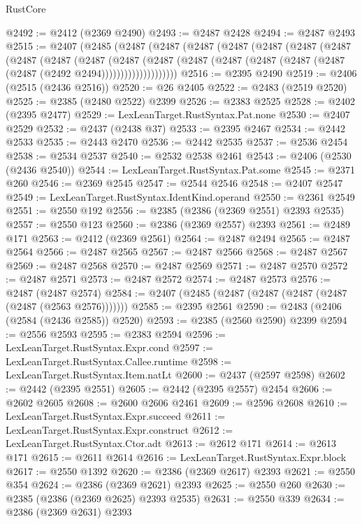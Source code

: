 \begin{lexlean}{RustCore}
\begin{coremodule}
@2492 := @2412 (@2369 @2490)
@2493 := @2487 @2428
@2494 := @2487 @2493
@2515 := @2407
    (@2485
      (@2487
        (@2487
          (@2487
            (@2487
              (@2487
                (@2487
                  (@2487
                    (@2487
                      (@2487
                        (@2487
                          (@2487
                            (@2487
                              (@2487
                                (@2487 (@2487 (@2487 (@2487 (@2487 (@2492 @2494))))))))))))))))))))
@2516 := @2395 @2490
@2519 := @2406 (@2515 (@2436 @2516))
@2520 := @26 @2405
@2522 := @2483 (@2519 @2520)
@2525 := @2385 (@2480 @2522) @2399
@2526 := @2383 @2525
@2528 := @2402 (@2395 @2477)
@2529 := LexLeanTarget.RustSyntax.Pat.none
@2530 := @2407 @2529
@2532 := @2437 (@2438 @37)
@2533 := @2395 @2467
@2534 := @2442 @2533
@2535 := @2443 @2470
@2536 := @2442 @2535
@2537 := @2536 @2454
@2538 := @2534 @2537
@2540 := @2532 @2538 @2461
@2543 := @2406 (@2530 (@2436 @2540))
@2544 := LexLeanTarget.RustSyntax.Pat.some
@2545 := @2371 @260
@2546 := @2369 @2545
@2547 := @2544 @2546
@2548 := @2407 @2547
@2549 := LexLeanTarget.RustSyntax.IdentKind.operand
@2550 := @2361 @2549
@2551 := @2550 @192
@2556 := @2385 (@2386 (@2369 @2551) @2393 @2535)
@2557 := @2550 @123
@2560 := @2386 (@2369 @2557) @2393
@2561 := @2489 @171
@2563 := @2412 (@2369 @2561)
@2564 := @2487 @2494
@2565 := @2487 @2564
@2566 := @2487 @2565
@2567 := @2487 @2566
@2568 := @2487 @2567
@2569 := @2487 @2568
@2570 := @2487 @2569
@2571 := @2487 @2570
@2572 := @2487 @2571
@2573 := @2487 @2572
@2574 := @2487 @2573
@2576 := @2487 (@2487 @2574)
@2584 := @2407 (@2485 (@2487 (@2487 (@2487 (@2487 (@2487 (@2563 @2576)))))))
@2585 := @2395 @2561
@2590 := @2483 (@2406 (@2584 (@2436 @2585)) @2520)
@2593 := @2385 (@2560 @2590) @2399
@2594 := @2556 @2593
@2595 := @2383 @2594
@2596 := LexLeanTarget.RustSyntax.Expr.cond
@2597 := LexLeanTarget.RustSyntax.Callee.runtime
@2598 := LexLeanTarget.RustSyntax.Item.natLt
@2600 := @2437 (@2597 @2598)
@2602 := @2442 (@2395 @2551)
@2605 := @2442 (@2395 @2557) @2454
@2606 := @2602 @2605
@2608 := @2600 @2606 @2461
@2609 := @2596 @2608
@2610 := LexLeanTarget.RustSyntax.Expr.succeed
@2611 := LexLeanTarget.RustSyntax.Expr.construct
@2612 := LexLeanTarget.RustSyntax.Ctor.adt
@2613 := @2612 @171
@2614 := @2613 @171
@2615 := @2611 @2614
@2616 := LexLeanTarget.RustSyntax.Expr.block
@2617 := @2550 @1392
@2620 := @2386 (@2369 @2617) @2393
@2621 := @2550 @354
@2624 := @2386 (@2369 @2621) @2393
@2625 := @2550 @260
@2630 := @2385 (@2386 (@2369 @2625) @2393 @2535)
@2631 := @2550 @339
@2634 := @2386 (@2369 @2631) @2393

\end{coremodule}
\end{lexlean}
